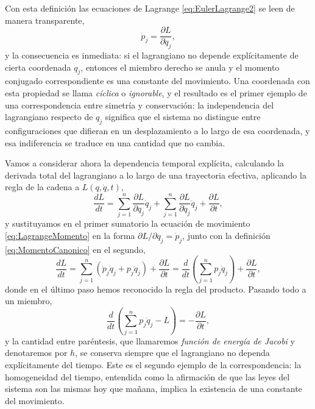         Con esta definición las ecuaciones de Lagrange \eqref{eq:EulerLagrange2} se leen de manera transparente,
        \begin{equation}\label{eq:LagrangeMomento}
            \dot{p}_{j} = \frac{\partial L}{\partial q_{j}},
        \end{equation}
        y la consecuencia es inmediata: si el lagrangiano no depende explícitamente de cierta coordenada $q_{j}$, entonces el miembro derecho se anula y el momento conjugado correspondiente es una constante del movimiento. Una coordenada con esta propiedad se llama \textit{cíclica} o \textit{ignorable}, y el resultado es el primer ejemplo de una correspondencia entre simetría y conservación: la independencia del lagrangiano respecto de $q_{j}$ significa que el sistema no distingue entre configuraciones que difieran en un desplazamiento a lo largo de esa coordenada, y esa indiferencia se traduce en una cantidad que no cambia.

        Vamos a considerar ahora la dependencia temporal explícita, calculando la derivada total del lagrangiano a lo largo de una trayectoria efectiva, aplicando la regla de la cadena a $L(q,\dot{q},t)$,
        \begin{equation}\label{eq:DerivadaTotalL}
            \frac{dL}{dt} = \sum_{j=1}^{n}\frac{\partial L}{\partial q_{j}}\dot{q}_{j} + \sum_{j=1}^{n}\frac{\partial L}{\partial\dot{q}_{j}}\ddot{q}_{j} + \frac{\partial L}{\partial t},
        \end{equation}
        y sustituyamos en el primer sumatorio la ecuación de movimiento \eqref{eq:LagrangeMomento} en la forma $\partial L/\partial q_{j} = \dot{p}_{j}$, junto con la definición \eqref{eq:MomentoCanonico} en el segundo,
        \begin{equation}\label{eq:DerivadaTotalL2}
            \frac{dL}{dt} = \sum_{j=1}^{n}\left(\dot{p}_{j}\dot{q}_{j} + p_{j}\ddot{q}_{j}\right) + \frac{\partial L}{\partial t}
            = \frac{d}{dt}\left(\sum_{j=1}^{n}p_{j}\dot{q}_{j}\right) + \frac{\partial L}{\partial t},
        \end{equation}
        donde en el último paso hemos reconocido la regla del producto. Pasando todo a un miembro,
        \begin{equation}\label{eq:FuncionJacobi}
            \frac{d}{dt}\left(\sum_{j=1}^{n}p_{j}\dot{q}_{j} - L\right) = -\frac{\partial L}{\partial t},
        \end{equation}
        y la cantidad entre paréntesis, que llamaremos \textit{función de energía de Jacobi} y denotaremos por $h$, se conserva siempre que el lagrangiano no dependa explícitamente del tiempo. Este es el segundo ejemplo de la correspondencia: la homogeneidad del tiempo, entendida como la afirmación de que las leyes del sistema son las mismas hoy que mañana, implica la existencia de una constante del movimiento.

